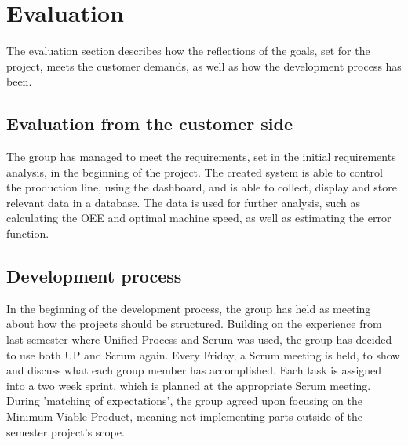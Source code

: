 \section{Evaluation}
The evaluation section describes how the reflections of the goals, set for the
project, meets the customer demands, as well as how the development process has
been.


\subsection{Evaluation from the customer side}
The group has managed to meet the requirements, set in the initial requirements
analysis, in the beginning of the project. The created system is able to control
the production line, using the dashboard, and is able to collect, display and
store relevant data in a database. The data is used for further analysis, such
as calculating the OEE and optimal machine speed, as well as estimating the
error function.


\subsection{Development process}
In the beginning of the development process, the group has held as meeting
about how the projects should be structured. Building on the experience from
last semester where Unified Process and Scrum was used, the group has
decided to use both UP and Scrum again. Every Friday, a Scrum meeting is held,
to show and discuss what each group member has accomplished. Each task is
assigned into a two week sprint, which is planned at the appropriate Scrum
meeting.
During 'matching of expectations', the group agreed upon focusing on the Minimum
Viable Product, meaning not implementing parts outside of the semester project's
scope.
